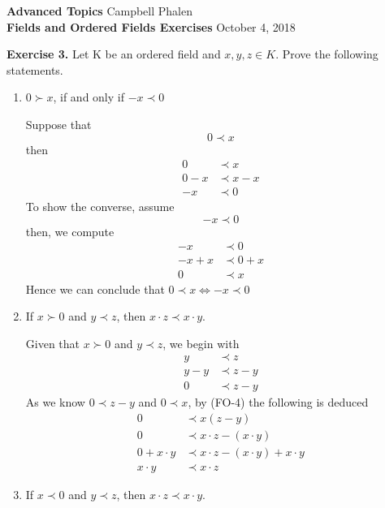\documentclass[11pt, leqno]{article}
\begin{document}
{\bfseries Advanced Topics} \hspace*{\fill} Campbell Phalen \\
{\bfseries Fields and Ordered Fields Exercises} \hspace*{\fill}October 4, 2018
\vspace{1pc}

\hrulefill
\vspace{1pc}
	
\textbf{Exercise 3.} Let K be an ordered field and $x, y, z \in K$. Prove the following statements.

\begin{enumerate}[label=(\alph*)]

	\item
	$0 \succ x$, if and only if $-x \prec 0$

	Suppose that
	\[
		0 \prec x
	\]
	then
	\begin{align*}
		0  &\prec x  \\
		0 - x &\prec x - x \\
		-x &\prec 0
	\end{align*}
	To show the converse, assume
	\[
		-x \prec 0
	\]
	then, we compute
	\begin{align*}
		-x &\prec 0  \\
		-x + x &\prec 0 + x \\
		0 &\prec x
	\end{align*}
	Hence we can conclude that $0 \prec x \iff -x \prec 0$
	
	\item
	If $x \succ 0$ and $y \prec z$, then $x \cdot z \prec x \cdot y$.
	
	Given that $x \succ 0$ and $y \prec z$, we begin with
	\begin{align*}
		y &\prec z \\
		y - y &\prec z - y \\
		0 &\prec z - y
	\end{align*}
	As we know $0 \prec z - y$ and $0 \prec x$, by (FO-4) the following is deduced
	\begin{align*}
		0 &\prec x(z - y) \\
		0 &\prec x \cdot z - (x \cdot y) \\
		0 + x \cdot y &\prec x \cdot z - (x \cdot y) + x \cdot y \\
		x \cdot y &\prec x \cdot z
	\end{align*}
	
	\item
	If $x \prec 0$ and $y \prec z$, then $x \cdot z \prec x \cdot y$.
	

\end{enumerate}
\end{document}
